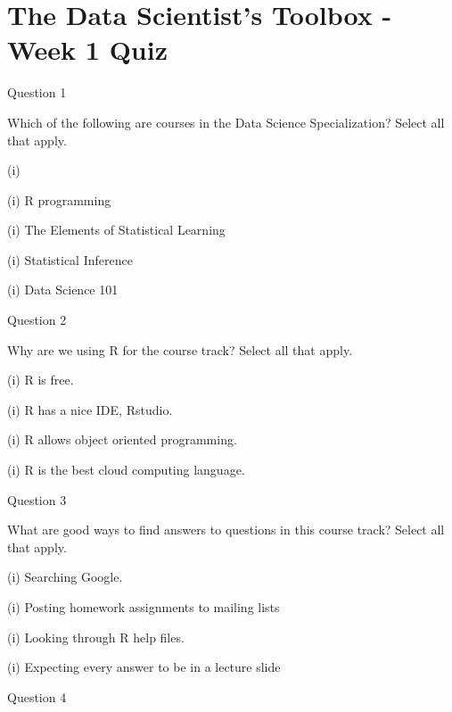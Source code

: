 \documentclass[12pt]{article}
\begin{document}
\section*{The Data Scientist’s Toolbox - Week 1 Quiz}

Question 1
 
Which of the following are courses in the Data Science Specialization? Select all that apply. 

\item[(i)]

\item[(i)] R programming 

\item[(i)] The Elements of Statistical Learning 

\item[(i)] Statistical Inference 

\item[(i)] Data Science 101 

Question 2
 
Why are we using R for the course track? Select all that apply. 


\item[(i)] R is free. 

\item[(i)] R has a nice IDE, Rstudio. 

\item[(i)] R allows object oriented programming. 

\item[(i)] R is the best cloud computing language. 

Question 3
 
What are good ways to find answers to questions in this course track? Select all that apply. 


\item[(i)] Searching Google. 

\item[(i)]
 Posting homework assignments to mailing lists 

\item[(i)] Looking through R help files. 

\item[(i)] Expecting every answer to be in a lecture slide 

Question 4
 
\end{document}
